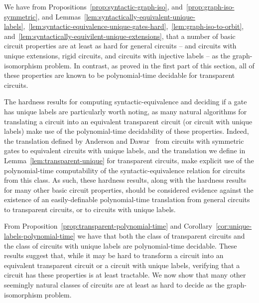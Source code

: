 \documentclass[../paper.tex]{subfiles}
\begin{document}
We have from Propositions~\ref{prop:syntactic-graph-iso},
and~\ref{prop:graph-iso-symmetric}, and
Lemmas~\ref{lem:syntactically-equivalent-unique-labels},~\ref{lem:syntactic-equivalence-unique-gates-hard},~\ref{lem:graph-iso-to-orbit},
and~\ref{lem:syntactically-equivilent-unique-extensions}, that a number of basic
circuit properties are at least as hard for general circuits -- and circuits
with unique extensions, rigid circuits, and circuits with injective labels -- as
the graph-isomorphism problem.  In contrast, as proved in the first part of this
section, all of these properties are known to be polynomial-time decidable for
transparent circuits.

The hardness results for computing syntactic-equivalence and deciding if a gate
has unique labels are particularly worth noting, as many natural algorithms for
translating a circuit into an equivalent transparent circuit (or circuit with
unique labels) make use of the polynomial-time decidability of these properties.
Indeed, the translation defined by Anderson and Dawar~\cite{AndersonD17} from
circuits with symmetric gates to equivalent circuits with unique labels, and the
translation we define in Lemma~\ref{lem:transparent-unique} for transparent
circuits, make explicit use of the polynomial-time computability of the
syntactic-equivalence relation for circuits from this class. As such, these
hardness results, along with the hardness results for many other basic circuit
properties, should be considered evidence against the existence of an
easily-definable polynomial-time translation from general circuits to
transparent circuits, or to circuits with unique labels.





From Proposition~\ref{prop:transparent-polynomial-time} and
Corollary~\ref{cor:unique-labels-polynomial-time} we have that both the class of
transparent circuits and the class of circuits with unique labels are
polynomial-time decidable. These results suggest that, while it may be hard to
transform a circuit into an equivalent transparent circuit or a circuit with
unique labels, verifying that a circuit has these properties is at least
tractable. We now show that many other seemingly natural classes of circuits are
at least as hard to decide as the graph-isomorphism problem.
\end{document}
